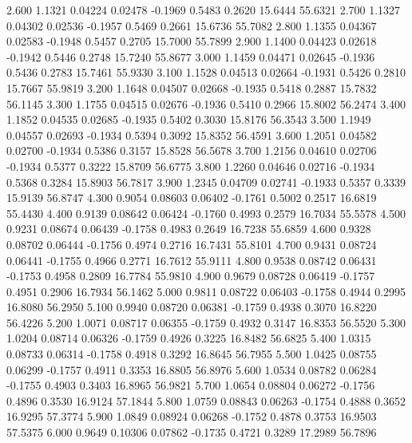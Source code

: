   2.600   1.1321   0.04224   0.02478  -0.1969   0.5483   0.2620  15.6444  55.6321
   2.700   1.1327   0.04302   0.02536  -0.1957   0.5469   0.2661  15.6736  55.7082
   2.800   1.1355   0.04367   0.02583  -0.1948   0.5457   0.2705  15.7000  55.7899
   2.900   1.1400   0.04423   0.02618  -0.1942   0.5446   0.2748  15.7240  55.8677
   3.000   1.1459   0.04471   0.02645  -0.1936   0.5436   0.2783  15.7461  55.9330
   3.100   1.1528   0.04513   0.02664  -0.1931   0.5426   0.2810  15.7667  55.9819
   3.200   1.1648   0.04507   0.02668  -0.1935   0.5418   0.2887  15.7832  56.1145
   3.300   1.1755   0.04515   0.02676  -0.1936   0.5410   0.2966  15.8002  56.2474
   3.400   1.1852   0.04535   0.02685  -0.1935   0.5402   0.3030  15.8176  56.3543
   3.500   1.1949   0.04557   0.02693  -0.1934   0.5394   0.3092  15.8352  56.4591
   3.600   1.2051   0.04582   0.02700  -0.1934   0.5386   0.3157  15.8528  56.5678
   3.700   1.2156   0.04610   0.02706  -0.1934   0.5377   0.3222  15.8709  56.6775
   3.800   1.2260   0.04646   0.02716  -0.1934   0.5368   0.3284  15.8903  56.7817
   3.900   1.2345   0.04709   0.02741  -0.1933   0.5357   0.3339  15.9139  56.8747
   4.300   0.9054   0.08603   0.06402  -0.1761   0.5002   0.2517  16.6819  55.4430
   4.400   0.9139   0.08642   0.06424  -0.1760   0.4993   0.2579  16.7034  55.5578
   4.500   0.9231   0.08674   0.06439  -0.1758   0.4983   0.2649  16.7238  55.6859
   4.600   0.9328   0.08702   0.06444  -0.1756   0.4974   0.2716  16.7431  55.8101
   4.700   0.9431   0.08724   0.06441  -0.1755   0.4966   0.2771  16.7612  55.9111
   4.800   0.9538   0.08742   0.06431  -0.1753   0.4958   0.2809  16.7784  55.9810
   4.900   0.9679   0.08728   0.06419  -0.1757   0.4951   0.2906  16.7934  56.1462
   5.000   0.9811   0.08722   0.06403  -0.1758   0.4944   0.2995  16.8080  56.2950
   5.100   0.9940   0.08720   0.06381  -0.1759   0.4938   0.3070  16.8220  56.4226
   5.200   1.0071   0.08717   0.06355  -0.1759   0.4932   0.3147  16.8353  56.5520
   5.300   1.0204   0.08714   0.06326  -0.1759   0.4926   0.3225  16.8482  56.6825
   5.400   1.0315   0.08733   0.06314  -0.1758   0.4918   0.3292  16.8645  56.7955
   5.500   1.0425   0.08755   0.06299  -0.1757   0.4911   0.3353  16.8805  56.8976
   5.600   1.0534   0.08782   0.06284  -0.1755   0.4903   0.3403  16.8965  56.9821
   5.700   1.0654   0.08804   0.06272  -0.1756   0.4896   0.3530  16.9124  57.1844
   5.800   1.0759   0.08843   0.06263  -0.1754   0.4888   0.3652  16.9295  57.3774
   5.900   1.0849   0.08924   0.06268  -0.1752   0.4878   0.3753  16.9503  57.5375
   6.000   0.9649   0.10306   0.07862  -0.1735   0.4721   0.3289  17.2989  56.7896
